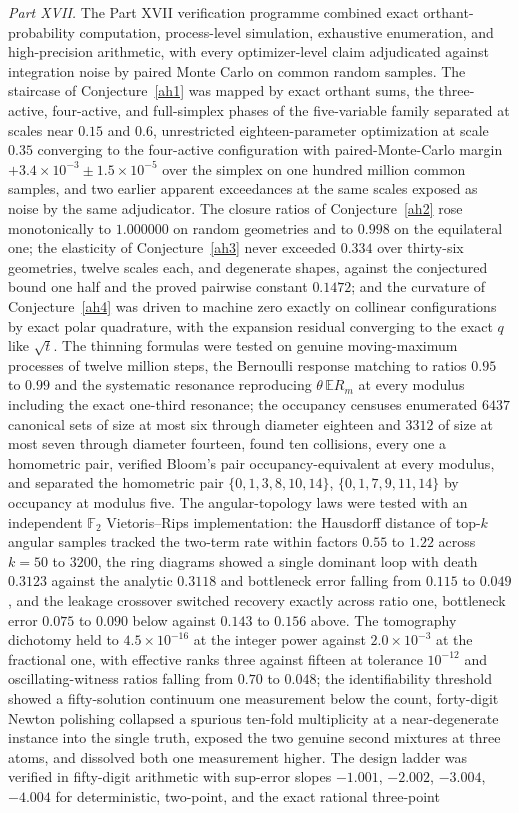 \documentclass[11pt]{article}
\theoremstyle{definition}
\newcommand{\E}{\mathbb E}
\providecommand{\E}{\mathbb E}
\begin{document}
\emph{Part XVII.}  The Part XVII verification programme combined exact orthant-probability computation, process-level simulation, exhaustive enumeration, and high-precision arithmetic, with every optimizer-level claim adjudicated against integration noise by paired Monte Carlo on common random samples.  The staircase of Conjecture~\ref{ah1} was mapped by exact orthant sums, the three-active, four-active, and full-simplex phases of the five-variable family separated at scales near $0.15$ and $0.6$, unrestricted eighteen-parameter optimization at scale $0.35$ converging to the four-active configuration with paired-Monte-Carlo margin $+3.4\times10^{-3}\pm1.5\times10^{-5}$ over the simplex on one hundred million common samples, and two earlier apparent exceedances at the same scales exposed as noise by the same adjudicator.  The closure ratios of Conjecture~\ref{ah2} rose monotonically to $1.000000$ on random geometries and to $0.998$ on the equilateral one; the elasticity of Conjecture~\ref{ah3} never exceeded $0.334$ over thirty-six geometries, twelve scales each, and degenerate shapes, against the conjectured bound one half and the proved pairwise constant $0.1472$; and the curvature of Conjecture~\ref{ah4} was driven to machine zero exactly on collinear configurations by exact polar quadrature, with the expansion residual converging to the exact $q$ like $\sqrt t$.  The thinning formulas were tested on genuine moving-maximum processes of twelve million steps, the Bernoulli response matching to ratios $0.95$ to $0.99$ and the systematic resonance reproducing $\theta\,\E R_m$ at every modulus including the exact one-third resonance; the occupancy censuses enumerated $6437$ canonical sets of size at most six through diameter eighteen and $3312$ of size at most seven through diameter fourteen, found ten collisions, every one a homometric pair, verified Bloom's pair occupancy-equivalent at every modulus, and separated the homometric pair $\{0,1,3,8,10,14\}$, $\{0,1,7,9,11,14\}$ by occupancy at modulus five.  The angular-topology laws were tested with an independent $\mathbb F_2$ Vietoris--Rips implementation: the Hausdorff distance of top-$k$ angular samples tracked the two-term rate within factors $0.55$ to $1.22$ across $k=50$ to $3200$, the ring diagrams showed a single dominant loop with death $0.3123$ against the analytic $0.3118$ and bottleneck error falling from $0.115$ to $0.049$, and the leakage crossover switched recovery exactly across ratio one, bottleneck error $0.075$ to $0.090$ below against $0.143$ to $0.156$ above.  The tomography dichotomy held to $4.5\times10^{-16}$ at the integer power against $2.0\times10^{-3}$ at the fractional one, with effective ranks three against fifteen at tolerance $10^{-12}$ and oscillating-witness ratios falling from $0.70$ to $0.048$; the identifiability threshold showed a fifty-solution continuum one measurement below the count, forty-digit Newton polishing collapsed a spurious ten-fold multiplicity at a near-degenerate instance into the single truth, exposed the two genuine second mixtures at three atoms, and dissolved both one measurement higher.  The design ladder was verified in fifty-digit arithmetic with sup-error slopes $-1.001$, $-2.002$, $-3.004$, $-4.004$ for deterministic, two-point, and the exact rational three-point 
\end{document}
